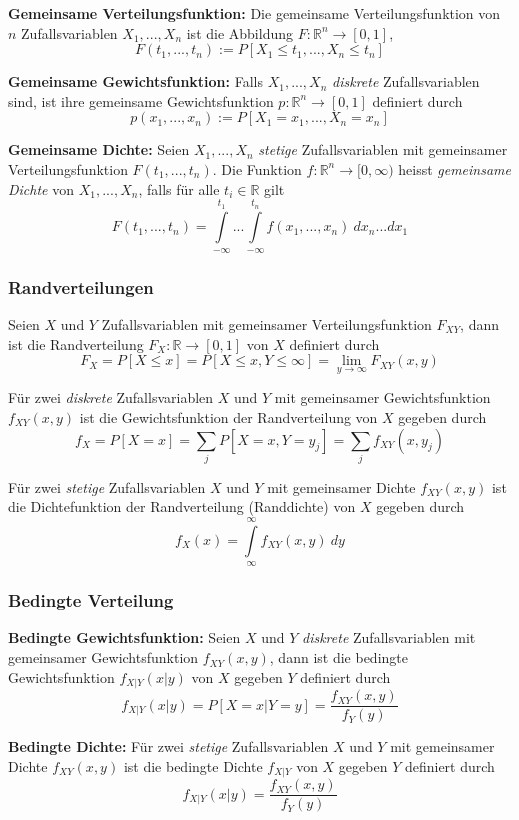 \documentclass[10pt,a4paper,twocolumn]{article}
\begin{document}
\textbf{Gemeinsame Verteilungsfunktion:} Die gemeinsame Verteilungsfunktion von $n$ Zufallsvariablen $X_1,...,X_n$ ist die Abbildung $F:\mathbb{R}^n\rightarrow [0,1]$,
\[
F(t_1,...,t_n):=P[X_1\leq t_1,...,X_n\leq t_n]
\]

\textbf{Gemeinsame Gewichtsfunktion:} Falls $X_1,...,X_n$ \emph{diskrete} Zufallsvariablen sind, ist ihre gemeinsame Gewichtsfunktion $p:\mathbb{R}^n\rightarrow [0,1]$ definiert durch
\[
p(x_1,...,x_n):=P[X_1=x_1,...,X_n=x_n]
\]

\textbf{Gemeinsame Dichte:} Seien $X_1,...,X_n$ \emph{stetige} Zufallsvariablen mit gemeinsamer Verteilungsfunktion $F(t_1,...,t_n)$. Die Funktion $f:\mathbb{R}^n\rightarrow [0,\infty)$ heisst \emph{gemeinsame Dichte} von $X_1,...,X_n$, falls für alle $t_i\in\mathbb{R}$ gilt
\[
F(t_1,...,t_n)=\int\limits_{-\infty}^{t_1}...\int\limits_{-\infty}^{t_n}f(x_1,...,x_n)\ dx_n...dx_1
\]

\subsubsection{Randverteilungen}
Seien $X$ und $Y$ Zufallsvariablen mit gemeinsamer Verteilungsfunktion $F_{XY}$, dann ist die Randverteilung $F_X:\mathbb{R}\rightarrow [0,1]$ von $X$ definiert durch
\[
F_X=P[X\leq x]=P[X\leq x,Y\leq\infty]=\lim_{y\to\infty}F_{XY}(x,y)
\]

Für zwei \emph{diskrete} Zufallsvariablen $X$ und $Y$ mit gemeinsamer Gewichtsfunktion $f_{XY}(x,y)$ ist die Gewichtsfunktion der Randverteilung von $X$ gegeben durch
\[
f_X=P[X=x]=\sum\limits_{j}P[X=x,Y=y_j]=\sum\limits_{j}f_{XY}(x,y_j)
\]

Für zwei \emph{stetige} Zufallsvariablen $X$ und $Y$ mit gemeinsamer Dichte $f_{XY}(x,y)$ ist die Dichtefunktion der Randverteilung (Randdichte) von $X$ gegeben durch
\[
f_X(x)=\int\limits_{\infty}^{\infty}f_{XY}(x,y)\ dy
\]

\subsubsection{Bedingte Verteilung}
\textbf{Bedingte Gewichtsfunktion:} Seien $X$ und $Y$ \emph{diskrete} Zufallsvariablen mit gemeinsamer Gewichtsfunktion $f_{XY}(x,y)$, dann ist die bedingte Gewichtsfunktion $f_{X|Y}(x|y)$ von $X$ gegeben $Y$ definiert durch
\[
f_{X|Y}(x|y)=P[X=x|Y=y]=\frac{f_{XY}(x,y)}{f_Y(y)}
\]

\textbf{Bedingte Dichte:} Für zwei \emph{stetige} Zufallsvariablen $X$ und $Y$ mit gemeinsamer Dichte $f_{XY}(x,y)$ ist die bedingte Dichte $f_{X|Y}$ von $X$ gegeben $Y$ definiert durch
\[
f_{X|Y}(x|y)=\frac{f_{XY}(x,y)}{f_Y(y)}
\]
\end{document}
